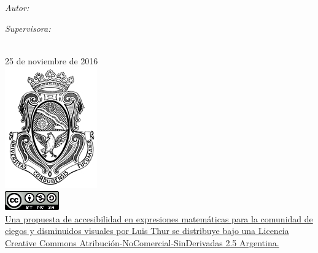 \documentclass[
11pt, %
oneside, %
english, %
doublespacing, %
nolistspacing, %
parskip, %
parident,
headsepline, %
]{MastersDoctoralThesis} %
\begin{document}
\begin{titlepage}
\begin{center}
\begin{minipage}[t]{0.4\textwidth}
\begin{flushleft} \large
\emph{Autor:}\\
\authorname %
\end{flushleft}
\end{minipage}
\begin{minipage}[t]{0.4\textwidth}
\begin{flushright} \large
\emph{Supervisora:} \\
\supname
\end{flushright}
\end{minipage}\\[1cm]
{25 de noviembre de 2016}\\[0.3cm] %
\includegraphics[scale=0.75]{figures/logo.jpg}\\ %
\href{http://creativecommons.org/licenses/by-nc-sa/2.5/ar/}{\includegraphics[scale=0.75]{figures/licencia.png}\\ %
{\scriptsize Una propuesta de accesibilidad en expresiones matemáticas para la comunidad de ciegos y disminuidos visuales por Luis  Thur se distribuye bajo una Licencia Creative Commons Atribución-NoComercial-SinDerivadas 2.5 Argentina.}}\\[0.3cm]
\vfill
\end{center}
\end{titlepage}


\renewcommand{\contentsname}{Contenido}
\tableofcontents %
\end{document}
